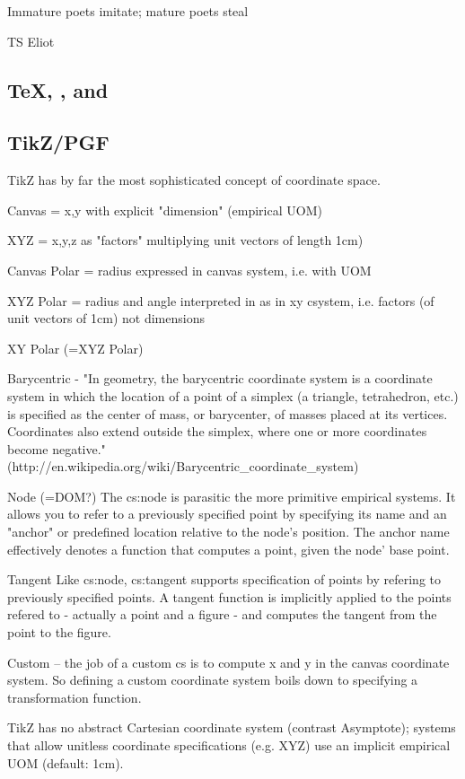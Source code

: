 \documentclass{tufte-handout}
\numberwithin{equation}{subsection}
\begin{document}
\epigraph{Immature poets imitate; mature poets steal}{TS Eliot}


\subsection{\TeX, \MF, and \MP}

\subsection{TikZ/PGF}
\label{subsec:tikz}

TikZ has by far the most sophisticated concept of coordinate space.

Canvas =  x,y with explicit "dimension" (empirical UOM)

XYZ    =  x,y,z as "factors" multiplying unit vectors of length 1cm)

Canvas Polar = radius expressed in canvas system, i.e. with UOM

XYZ Polar  = radius and angle interpreted in as in xy csystem, i.e. factors (of unit vectors of 1cm) not dimensions

XY Polar (=XYZ Polar)

Barycentric  -  "In geometry, the barycentric coordinate system is a coordinate system in which the location of a point of a simplex (a triangle, tetrahedron, etc.) is specified as the center of mass, or barycenter, of masses placed at its vertices. Coordinates also extend outside the simplex, where one or more coordinates become negative."   (http://en.wikipedia.org/wiki/Barycentric\_coordinate\_system)

Node (=DOM?)  The cs:node is parasitic the more primitive empirical
systems.  It allows you to refer to a previously specified point by
specifying its name and an "anchor" or predefined location relative to
the node's position.  The anchor name effectively denotes a function
that computes a point, given the node' base point.

Tangent Like cs:node, cs:tangent supports specification of points by
refering to previously specified points.  A tangent function is
implicitly applied to the points refered to - actually a point and a
figure - and computes the tangent from the point to the figure.

Custom -- the job of a custom cs is to compute x and y in the canvas
coordinate system.  So defining a custom coordinate system boils down
to specifying a transformation function.

TikZ has no abstract Cartesian coordinate system (contrast Asymptote);
systems that allow unitless coordinate specifications (e.g. XYZ) use
an implicit empirical UOM (default: 1cm).
\end{document}
